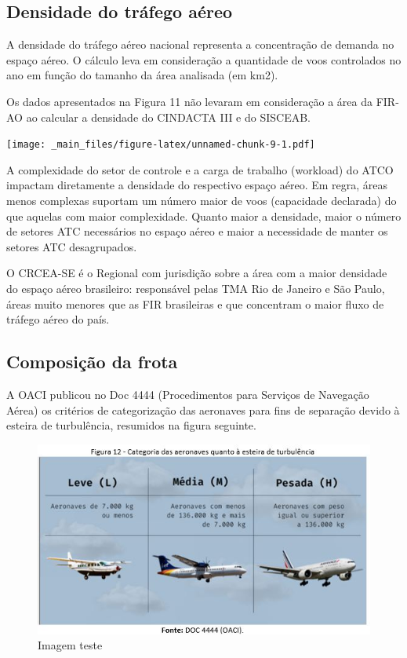 \documentclass[
]{book}
\begin{document}
\hypertarget{densidade-do-truxe1fego-auxe9reo}{%
\subsection{Densidade do tráfego aéreo}\label{densidade-do-truxe1fego-auxe9reo}}

A densidade do tráfego aéreo nacional representa a concentração de demanda no espaço aéreo. O cálculo leva em consideração a quantidade de voos controlados no ano em função do tamanho da área analisada (em km2).

Os dados apresentados na Figura 11 não levaram em consideração a área da FIR-AO ao calcular a densidade do CINDACTA III e do SISCEAB.

\texttt{[image: \_main\_files/figure-latex/unnamed-chunk-9-1.pdf]}

A complexidade do setor de controle e a carga de trabalho (workload) do ATCO impactam diretamente a densidade do respectivo espaço aéreo. Em regra, áreas menos complexas suportam um número maior de voos (capacidade declarada) do que aquelas com maior complexidade. Quanto maior a densidade, maior o número de setores ATC necessários no espaço aéreo e maior a necessidade de manter os setores ATC desagrupados.

O CRCEA-SE é o Regional com jurisdição sobre a área com a maior densidade do espaço aéreo brasileiro: responsável pelas TMA Rio de Janeiro e São Paulo, áreas muito menores que as FIR brasileiras e que concentram o maior fluxo de tráfego aéreo do país.

\hypertarget{composiuxe7uxe3o-da-frota}{%
\subsection{Composição da frota}\label{composiuxe7uxe3o-da-frota}}

A OACI publicou no Doc 4444 (Procedimentos para Serviços de Navegação Aérea) os critérios de categorização das aeronaves para fins de separação devido à esteira de turbulência, resumidos na figura seguinte.

\begin{figure}
\centering
\includegraphics{imagens/fig15.jpg}
\caption{Imagem teste}
\end{figure}
\end{document}

